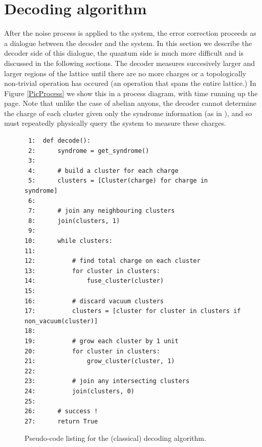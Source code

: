 %
%

\section{Decoding algorithm}

After the noise process is applied to the system,
the error correction proceeds as a dialogue between the
decoder and the system. 
In this section we describe the decoder side of this dialogue,
the quantum side is much more difficult and is discussed in the
following sections.
%
%
%
The decoder measures succesively larger and larger
regions of the lattice
until there are no more charges 
or a topologically non-trivial operation has occured
(an operation that spans the entire lattice.)
In Figure \ref{PicProcess}
we show this in a process diagram, with time running up
the page.
Note that unlike the case of abelian anyons, the decoder
cannot determine the charge of each cluster 
given only the syndrome information (as in \cite{Bravyi2011}),
and so must repeatedly physically query the system to measure these charges.




\begin{figure}
\begin{verbatim}
 1:  def decode():
 2:      syndrome = get_syndrome()
 3:      
 4:      # build a cluster for each charge
 5:      clusters = [Cluster(charge) for charge in syndrome]
 6:  
 7:      # join any neighbouring clusters
 8:      join(clusters, 1)
 9:      
10:      while clusters:
11:      
12:          # find total charge on each cluster
13:          for cluster in clusters:
14:              fuse_cluster(cluster)
15:      
16:          # discard vacuum clusters
17:          clusters = [cluster for cluster in clusters if non_vacuum(cluster)]
18:      
19:          # grow each cluster by 1 unit
20:          for cluster in clusters:
21:              grow_cluster(cluster, 1)
22:      
23:          # join any intersecting clusters
24:          join(clusters, 0)
25:  
26:      # success !
27:      return True
\end{verbatim} %
\caption{Pseudo-code listing for the (classical) decoding algorithm.}
\label{PseudoCode}
\end{figure}

